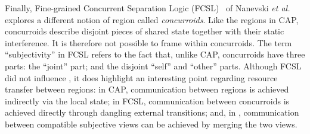 


Finally, Fine-grained Concurrent Separation Logic
(FCSL)~\cite{scsl-esop14} of Nanevski {\em et al.} explores a
different notion of region called {\em concurroids}. Like the regions
in CAP, concurroids describe disjoint pieces of shared state together
with their static interference. It is therefore not possible to frame
within concurroids. The term ``subjectivity'' in FCSL refers to the
fact that, unlike CAP, concurroids have three parts: the ``joint''
part; and the disjoint ``self'' and ``other'' parts.  Although FCSL
did not influence \colosl, it does highlight an interesting point
regarding resource transfer between regions: in CAP, communication
between regions is achieved indirectly via the local state; in FCSL,
communication between concurroids is achieved directly through
dangling external transitions; and, in \colosl, communication between
compatible subjective views can be achieved by merging the two views.







